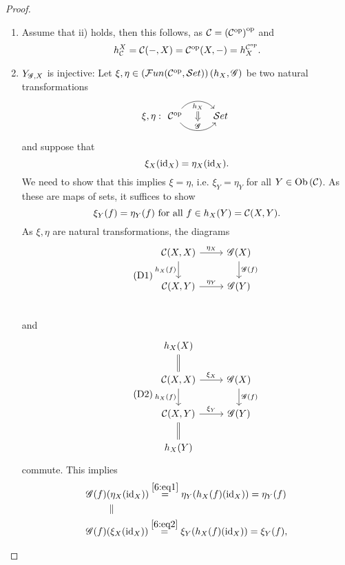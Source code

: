\begin{proof}
  \begin{enumerate}
    \item Assume that ii) holds, then this follows, as $\mathcal{C} = \left(\mathcal{C}^{\mathrm{op}}\right)^{\mathrm{op}}$ and
    \[
    h^X_{\mathcal{C}} = \mathcal{C}(-,X) = \mathcal{C}^{\mathrm{op}}(X,-)=h_X^{\mathcal{C}^{\mathrm{op}}}.
    \]
    \item $Y_{\mathscr{G},X}$ is injective: Let $\xi,\eta\in \left(\mathcal{F}un(\mathcal{C}^{\mathrm{op}},\mathcal{S}et)\right)(h_X,\mathscr{G})$ be two natural transformations
    \[
    \xi,\eta: \begin{tikzcd}
    \op{\ccat} \arrow[r, bend left=50, "h_X"{name=U, below}]
    \arrow[r, bend right=50, "\gfunc"{name=D}]
    &\stc
    \arrow[Rightarrow, from=U, to=D]
  \end{tikzcd}\]
  and suppose that
  \[
  \xi_X(\operatorname{id}_X)=\eta_X(\operatorname{id}_X).
  \]
  We need to show that this implies $\xi=\eta$, i.e. $\xi_Y=\eta_Y$ for all $Y\in \text{Ob}\left(\mathcal{\mathcal{C}}\right)$. As these are maps of sets, it suffices to show
  \[
  \xi_Y(f)=\eta_Y(f)~\text{for all }f\in h_X(Y)=\mathcal{C}(X,Y).
  \]
  As $\xi,\eta$ are natural transformations, the diagrams
  \begin{equation}\tag{D1}\label{6:eq1}
  \begin{tikzcd}
    \ccat(X,X)\ar{r}{\eta_X}\ar[swap]{d}{h_X(f)}&\gfunc(X)\ar{d}{\gfunc(f)}\\
    \ccat(X,Y)\ar{r}{\eta_Y}&\gfunc(Y)\\
  \end{tikzcd}
\end{equation}
  and
  \begin{equation}\tag{D2}\label{6:eq2}
  \begin{tikzcd}
  h_X(X)\ar[equal]{d}&\\
  \ccat(X,X)\ar{r}{\xi_X}\ar[swap]{d}{h_X(f)}&\gfunc(X)\ar{d}{\gfunc(f)}\\
  \ccat(X,Y)\ar{r}{\xi_Y}&\gfunc(Y)\\
  h_X(Y)\ar[equal]{u}&
\end{tikzcd}
\end{equation}
commute. This implies
\begin{align*}
  \mathscr{G}(f)&(\eta_X(\operatorname{id}_X)) \overset{\eqref{6:eq1}}{=}\eta_Y(h_X(f)(\operatorname{id}_X)) = \eta_Y(f)\\
  &\parallel\\
  \mathscr{G}(f)&(\xi_X(\operatorname{id}_X)) \overset{\eqref{6:eq2}}{=}\xi_Y(h_X(f)(\operatorname{id}_X)) = \xi_Y(f),
\end{align*}

\end{enumerate}
\end{proof}
